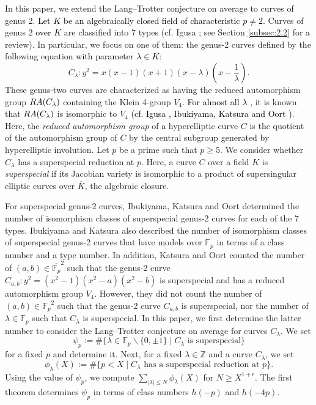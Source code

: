 \documentclass[10pt,a4paper]{amsart}
\theoremstyle{plain}
\newcommand{\lm}{\lambda}
\newcommand{\fp}{\mathbb{F}_p}
\newcommand{\bZ}{\mathbb{Z}}
\begin{document}
 
In this paper, we extend the Lang--Trotter conjecture on average to curves of genus 2. \textcolor{black}{Let $K$ be an algebraically closed field of characteristic $p \ne 2$.} Curves of genus 2 \textcolor{black}{over $K$}  are classified into 7 types (cf. Igusa \cite{Igusa}; see Section \ref{subsec:2.2} for a review). In particular, we focus on one of them: the genus-2 curves defined by the following equation \textcolor{black}{with parameter $\lm \in K$}:
\[
C_{\lm}:y^2=x(x-1)(x+1)(x-{\lambda}) \left(x-\frac{1}{\lambda}\right).
\]
 These genus-two curves are characterized as having the reduced automorphism group ${\rm RA}(C_\lambda)$ containing the Klein 4-group $V_4$. \textcolor{black}{For almost all $\lambda$} , it is known that ${\rm RA}(C_\lambda)$ is isomorphic to $V_4$ \textcolor{black}{(cf. Igusa \cite[\S 8]{Igusa}, Ibukiyama, Katsura and Oort \cite[\S 1]{IKO02})}. 
Here, the \textit{reduced automorphism group} of \textcolor{black}{a} hyperelliptic curve $C$ is the quotient of the automorphism group of $C$ by the central subgroup generated by hyperelliptic involution.
Let $p$ be a prime such that $p \ge 5$. We consider whether $C_{\lm}$ has a superspecial reduction at $p$.
Here, a curve $C$ over a field $K$ is \textit{superspecial} if its Jacobian variety is isomorphic to a product of supersingular elliptic curves over $\overline{K}$, the algebraic closure. 

For superspecial genus-2 curves, Ibukiyama, Katsura and Oort \cite{IKO02} determined the number of isomorphism classes of superspecial genus-2 curves for each of the 7 types. Ibukiyama and Katsura \cite{IKadd} also described the number of isomorphism classes of superspecial genus-2 curves that have models over $\fp$ in terms of a class number and a type number. In addition, Katsura and Oort \cite{KatsuraOort} counted the number of $(a,b) \in {\overline{\fp}}^2$ 
such that the genus-2 curve $C_{a,b}:y^2=(x^2-1)(x^2-a)(x^2-b)$ is superspecial
and has a reduced automorphism group $V_4$.
However, they did not count the number of $(a,b) \in {\fp}^2$ 
such that the genus-2 curve $C_{a,b}$ is superspecial, nor the number of $\lambda\in\fp$ such that $C_\lambda$ is superspecial.
In this paper, we first determine the latter number to consider the Lang--Trotter conjecture on average for curves $C_{\lm}$. We set
\[
{\psi}_{p} := \# \lbrace \lm \in \fp\smallsetminus \{ 0, \pm1\} \mid C_{\lm} \text{ is superspecial}  \rbrace
\]
for a fixed $p$ and determine it. Next, for a fixed $\lm \in \bZ$ and a curve $C_{\lm}$, we set
\[
{\phi}_{\lm}(X):= \# \lbrace p<X \mid C_{\lm} \text{ has a superspecial reduction at } p  \rbrace .
\]
Using the value of $\psi_p$, we compute $\sum_{\lvert \lm \rvert \le N} {\phi}_{\lm}(X)$ for $N \ge X^{1+\epsilon}$. The first theorem determines $\psi_p$ in terms of class numbers $h(-p)$ and $ h(-4p)$. 
\end{document}
